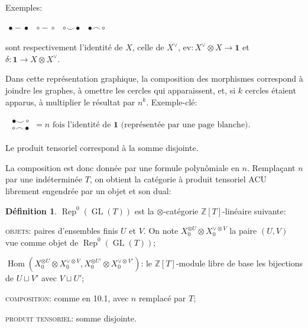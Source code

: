 \documentclass[11pt,a4paper]{article}
\theoremstyle{plain}
\theoremstyle{definition}
\newtheorem{definition}[theorem]{D\'efinition}
\DeclareMathOperator{\Hom}{Hom}
\DeclareMathOperator{\Rep}{Rep}
\DeclareMathOperator{\GL}{GL}
\newcommand{\Z}{\mathbb{Z}}
\newcommand{\ev}{\mathrm{ev}}
\begin{document}
Exemples:

\begin{center}
$\begin{array}{ccccc}
\bullet\!\!\!-\!\!\!\bullet & \circ\!\!\!-\!\!\!\circ & \circ\!\!\!\smile\!\!\!\bullet & \bullet\!\!\!\frown\!\!\!\circ
\end{array}$
\end{center}

sont respectivement l'identit\'e de $X$, celle de $X^\vee$, $\ev : X^\vee \otimes X \to \mathbf{1}$ et $\delta : \mathbf{1} \to X \otimes X^\vee$.

Dans cette repr\'esentation graphique, la composition des morphismes correspond \`a joindre les graphes, \`a omettre les cercles qui apparaissent, et, si $k$ cercles \'etaient apparus, \`a multiplier le r\'esultat par $n^k$. Exemple-cl\'e:

\begin{center}
$\begin{array}{c}
\begin{array}{cc}
\bullet\!\!\!\smile\!\!\!\circ \\
\circ\!\!\!\frown\!\!\!\bullet
\end{array}
= n \text{ fois l'identit\'e de } \mathbf{1} \text{ (repr\'esent\'ee par une page blanche).}
\end{array}$
\end{center}

Le produit tensoriel correspond \`a la somme disjointe.

La composition est donc donn\'ee par une formule polyn\^omiale en $n$. Rempla\c{c}ant $n$ par une ind\'etermin\'ee $T$, on obtient la cat\'egorie \`a produit tensoriel ACU librement engendr\'ee par un objet et son dual:

\begin{definition}
$\Rep^0(\GL(T))$ est la $\otimes$-cat\'egorie $\Z[T]$-lin\'eaire suivante:

\textsc{objets}: paires d'ensembles finis $U$ et $V$. On note $X_0^{\otimes U} \otimes X_0^{\vee \otimes V}$ la paire $(U, V)$ vue comme objet de $\Rep^0(\GL(T))$;

$\Hom(X_0^{\otimes U} \otimes X_0^{\vee \otimes V}, X_0^{\otimes U'} \otimes X_0^{\vee \otimes V'})$: le $\Z[T]$-module libre de base les bijections de $U \sqcup V'$ avec $V \sqcup U'$;

\textsc{composition}: comme en 10.1, avec $n$ remplac\'e par $T$;

\textsc{produit tensoriel}: somme disjointe.
\end{definition}
\end{document}
